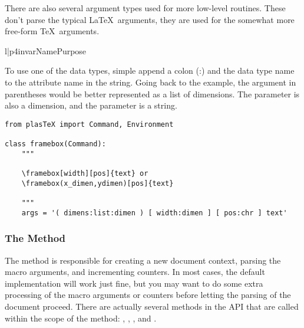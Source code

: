 There are also several argument types used for more low-level routines.
These don't parse the typical \LaTeX\ arguments, they are used for
the somewhat more free-form \TeX\ arguments.
\begin{tableii}{l|p{4in}}{var}{Name}{Purpose}
\end{tableii}

To use one of the data types, simple append a colon (:) and the data
type name to the attribute name in the  string.
Going back to the  example, the argument in 
parentheses would be better represented as a list of dimensions.
The  parameter is also a dimension, and the  parameter
is a string.
\begin{verbatim}
from plasTeX import Command, Environment

class framebox(Command):
    """ 

    \framebox[width][pos]{text} or 
    \framebox(x_dimen,ydimen)[pos]{text} 

    """
    args = '( dimens:list:dimen ) [ width:dimen ] [ pos:chr ] text'
\end{verbatim}


\subsubsection{The  Method}

The  method is responsible for creating a new document
context, parsing the macro arguments, and incrementing counters.
In most cases, the default implementation will work just fine, but you
may want to do some extra processing of the macro arguments or 
counters before letting the parsing of the document proceed.  There
are actually several methods in the API that are called within the
scope of the  method: , ,
, and .

